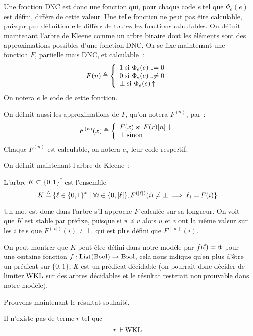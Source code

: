 \documentclass{article}
\begin{document}
Une fonction DNC est donc une fonction qui, pour chaque code $e$ tel que $\Phi_e(e)$ est défini, diffère de cette valeur. Une telle fonction ne peut pas être calculable, puisque par définition elle diffère de toutes les fonctions calculables. On définit maintenant l'arbre de Kleene comme un arbre binaire dont les éléments sont des approximations possibles d'une fonction DNC. On se fixe maintenant une fonction $F$, partielle mais DNC, et calculable~:
\[F(n)\triangleq \left\{\begin{array}{l}
    1\text{ si } \Phi_e(e) \downarrow= 0\\
    0\text{ si } \Phi_e(e) \downarrow \neq 0\\
    \bot\text{ si } \Phi_e(e) \uparrow
\end{array}\right.\]
On notera $e$ le code de cette fonction.

On définit aussi les approximations de $F$, qu'on notera $F^{(n)}$, par~:
\[F^{(n)}(x) \triangleq \left\{\begin{array}{l}
    F(x) \text{ si } F(x)[n]\downarrow\\
    \bot\text{ sinon}
\end{array}\right.\]
Chaque $F^{(n)}$ est calculable, on notera $e_n$ leur code respectif.

On définit maintenant l'arbre de Kleene~:

\begin{defi}
    L'arbre $K\subseteq \{0,1\}^*$ est l'ensemble
    \[K \triangleq \{\ell \in \{0,1\}^* \mid \forall i \in \{0,|\ell|\}, F^{(|\ell|)}(i) \neq \bot \implies \ell_i = F(i)\}\]
\end{defi}

Un mot est donc dans l'arbre s'il approche $F$ calculée sur sa longueur. On voit que $K$ est stable par préfixe, puisque si $u\preceq v$ alors $u$ et $v$ ont la même valeur sur les $i$ tels que $F^{(|v|)}(i)\neq \bot$, qui est plus défini que $F^{(|u|)}(i)$.

On peut montrer que $K$ peut être défini dans notre modèle par $f(\ell) = \mathrm{t}\!\mathrm{t}$ pour une certaine fonction $f : \mathrm{List}(\mathrm{Bool}) \to \mathrm{Bool}$, cela nous indique qu'en plus d'être un prédicat sur $\{0,1\}$, $K$ est un prédicat décidable (on pourrait donc décider de limiter $\mathrm{WKL}$ sur des arbres décidables et le résultat resterait non prouvable dans notre modèle).

Prouvons maintenant le résultat souhaité.

\begin{them}
    Il n'existe pas de terme $r$ tel que
    \[r\Vdash \mathrm{WKL}\]
\end{them}
\end{document}
